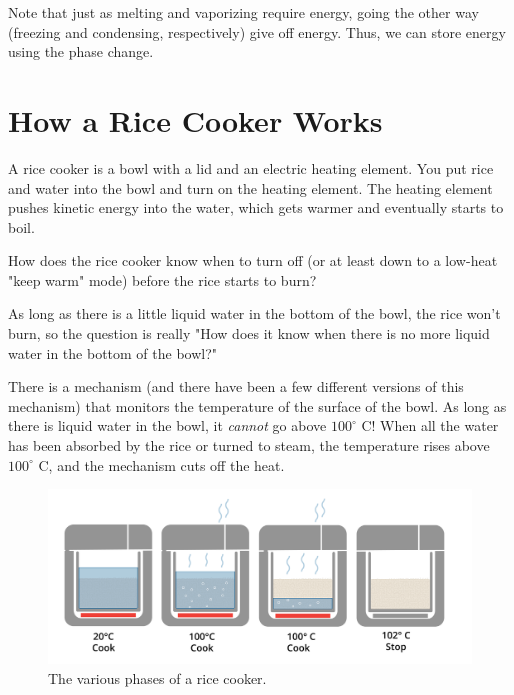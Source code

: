 Note that just as melting and vaporizing require energy, going the other way (freezing and condensing, respectively) give off energy. Thus, we can store energy using the phase change.

\section{How a Rice Cooker Works}

A rice cooker is a bowl with a lid and an electric heating element. You put rice and water into the bowl and turn on the heating element. The heating element pushes kinetic energy into the water, which gets warmer and eventually starts to boil.

How does the rice cooker know when to turn off (or at least down to a low-heat "keep warm" mode) before the rice starts to burn?

As long as there is a little liquid water in the bottom of the bowl, the rice won't burn, so the question is really "How does it know when there is no more liquid water in the bottom of the bowl?"

There is a mechanism (and there have been a few different versions of this mechanism) that monitors the temperature of the surface of the bowl. As long as there is liquid water in the bowl, it \emph{cannot} go above $100^\circ$ C! When all the water has been absorbed by the rice or turned to steam, the temperature rises above $100^\circ$ C, and the mechanism cuts off the heat.
\begin{figure}[htbp]
    \centering
    \includegraphics[width=0.9\linewidth]{riceCookerPhase.png}
    \caption{The various phases of a rice cooker.}
    \label{fig:riceCookerPhase}
\end{figure}


